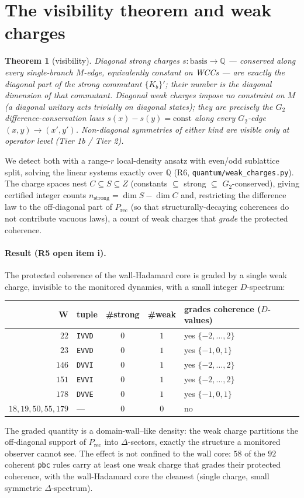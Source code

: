 \documentclass[11pt]{article}
\newcommand{\rt}[1]{\texttt{#1}}
\newcommand{\fn}[1]{\texttt{#1}}
\newcommand{\Prec}{P_{\mathrm{rec}}}
\newcommand{\GG}{G_2}
\theoremstyle{plain}
\newtheorem{theorem}{Theorem}
\theoremstyle{definition}
\begin{document}
\section{The visibility theorem and weak charges}
\begin{theorem}[visibility]\label{thm:vis}
Diagonal \emph{strong} charges $s:\text{basis}\to\mathbb{Q}$ --- conserved along
every single-branch $M$-edge, equivalently constant on WCCs --- are exactly the
diagonal part of the strong commutant $\{K_b\}'$; their number is the diagonal
dimension of that commutant. Diagonal \emph{weak} charges impose \emph{no}
constraint on $M$ (a diagonal unitary acts trivially on diagonal states); they
are precisely the $\GG$ difference-conservation laws
$s(x)-s(y)=\text{const}$ along every $\GG$-edge $(x,y)\to(x',y')$. Non-diagonal
symmetries of either kind are visible only at operator level (Tier 1b / Tier 2).
\end{theorem}
We detect both with a range-$r$ local-density ansatz with even/odd sublattice
split, solving the linear systems exactly over $\mathbb{Q}$ (R6,
\fn{quantum/weak\_charges.py}). The charge spaces nest $C\subseteq S\subseteq Z$
(constants $\subseteq$ strong $\subseteq$ $\GG$-conserved), giving certified
integer counts $n_{\text{strong}}=\dim S-\dim C$ and, restricting the difference
law to the off-diagonal part of $\Prec$ (so that structurally-decaying
coherences do not contribute vacuous laws), a count of weak charges that
\emph{grade} the protected coherence.

\paragraph{Result (R5 open item i).} The protected coherence of the
wall-Hadamard core is graded by a single weak charge, invisible to the monitored
dynamics, with a small integer $D$-spectrum:

\begin{center}\small
\begin{tabular}{@{}rl cc l@{}}
\toprule
W & tuple & \#strong & \#weak & grades coherence ($D$-values) \\
\midrule
$22$ & \rt{IVVD} & $0$ & $1$ & yes $\{-2,\dots,2\}$ \\
$23$ & \rt{EVVD} & $0$ & $1$ & yes $\{-1,0,1\}$ \\
$146$ & \rt{DVVI} & $0$ & $1$ & yes $\{-2,\dots,2\}$ \\
$151$ & \rt{EVVI} & $0$ & $1$ & yes $\{-2,\dots,2\}$ \\
$178$ & \rt{DVVE} & $0$ & $1$ & yes $\{-1,0,1\}$ \\
$18,19,50,55,179$ & --- & $0$ & $0$ & no \\
\bottomrule
\end{tabular}
\end{center}
The graded quantity is a domain-wall--like density: the weak charge partitions
the off-diagonal support of $\Prec$ into $\Delta$-sectors, exactly the structure
a monitored observer cannot see. The effect is not confined to the wall core:
$58$ of the $92$ coherent \rt{pbc} rules carry at least one weak charge that
grades their protected coherence, with the wall-Hadamard core the cleanest
(single charge, small symmetric $\Delta$-spectrum).
\end{document}
